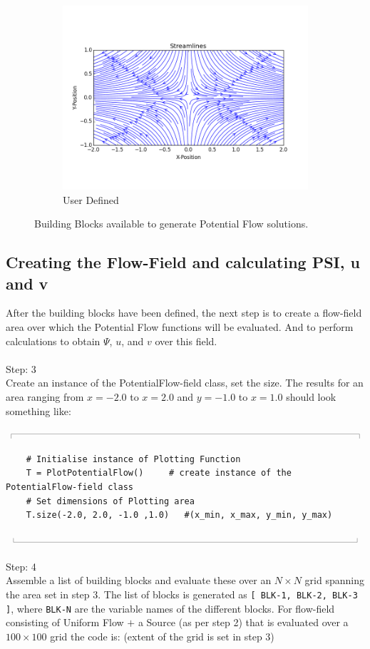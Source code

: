 \documentclass[10pt,a4paper]{article}
\newcommand{\topbar}{\ensuremath{
    \rule{0.1mm}{2.0mm} \rule[2.0mm]{159.5mm}{0.1mm} \rule{0.1mm}{2.0mm}
}}
\newcommand{\bottombar}{\ensuremath{
    \rule{0.1mm}{2.0mm} \rule{159.5mm}{0.1mm} \rule{0.1mm}{2.0mm}
}}
\begin{document}
\begin{figure}
\begin{subfigure}{0.32\textwidth}
    \includegraphics[width=1.0\textwidth]{Figures/User_Defined}
  \caption{User Defined}\label{F_User}
\end{subfigure}
\hfill
\caption{Building Blocks available to generate Potential Flow solutions.}
\label{F_Blocks}
\end{figure}


\subsection{Creating the Flow-Field and calculating PSI, u and v}

After the building blocks have been defined, the next step is to create a flow-field area over which the Potential Flow functions will be evaluated. 
And to perform calculations to obtain $\Psi$, $u$, and $v$ over this field.
\\ \\
\noindent
{\LARGE Step: 3}\\
Create an instance of the PotentialFlow-field class, set the size. 
The results for an area ranging from $x = \num{-2.0}$ to $x=\num{2.0}$ and $y = \num{-1.0}$ to $x=\num{1.0}$ should look something like:

\noindent
\topbar
\begin{lstlisting}
    # Initialise instance of Plotting Function
    T = PlotPotentialFlow()   	# create instance of the PotentialFlow-field class
    # Set dimensions of Plotting area
    T.size(-2.0, 2.0, -1.0 ,1.0)   #(x_min, x_max, y_min, y_max)
\end{lstlisting}
\bottombar
\\ \\
\noindent
{\LARGE Step: 4}\\
Assemble a list of building blocks and evaluate these over an $N \times N$ grid spanning the area set in step 3. 
The list of blocks is generated as \verb'[ BLK-1, BLK-2, BLK-3 ]', where \verb'BLK-N' are the variable names of the different blocks. 
For flow-field consisting of Uniform Flow $+$ a Source (as per step 2) that is evaluated over a $100 \times 100$ grid the code is: (extent of the grid is set in step 3)
\end{document}
